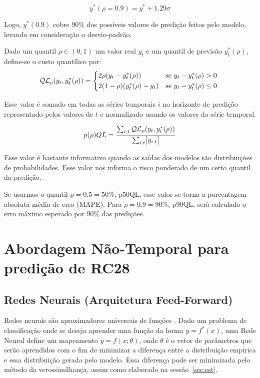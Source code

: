 \[
  y^*(\rho = 0.9) = y^* + 1.29\sigma
\]

Logo, $y^*(0.9)$ cobre $90\%$ dos possíveis valores de predição feitos pelo
modelo, levando em consideração o desvio-padrão.

Dado um quantil $\rho \in (0,1)$ um valor real $y_{t}$ e um quantil de previsão 
$y^{*}_{t}(\rho)$, define-se o custo quantílico por: \\

\begin{equation}
  \mathcal{QL}_{\rho}(y_{t},y^{*}_{t}(\rho)) =
\begin{cases*}
  2 \rho(y_{t} - y^{*}_{t}(\rho)) & se $ y_{t} - y^{*}_{t}(\rho) > 0$ \\
  2 (1 - \rho)(y^{*}_{t}(\rho) - y_{t}) & se $y_{t} - y^{*}_{t}(\rho) \leq 0$
\end{cases*}
\end{equation}


Esse valor é somado em todas as séries temporais $i$ no horizonte de predição
representado pelos valores de $t$ e normalizado usando os valores da série temporal.


\[
   p(\rho)QL = \frac{\sum_{i,t}\mathcal{QL}_{\rho}(y_{t},y^{*}_{t}(\rho))}{\sum_{i,t}\abs{y_{i,t}}}
\]


Esse valor é bastante informativo quando as saídas dos modelos são distribuições
de probabilidades. Esse valor nos informa o risco ponderado de um certo quantil
da predição.

Se usarmos o quantil $\rho=0.5=50\%$, p50QL,
esse valor se torna a porcentagem absoluta média de erro (MAPE). Para
$\rho=0.9=90\%$, p90QL, será
calculado o erro máximo esperado por $90\%$ das predições.





\section{Abordagem Não-Temporal para predição de RC28} 


\subsection{Redes Neurais (Arquitetura Feed-Forward)}

\label{sec:nn}
Redes neurais são aproximadores universais de funções \citep{nnuni}. Dado um problema
de classificação onde se deseja aprender uma função da forma $y = f^*(x)$, uma
Rede Neural define um mapeamento $y = f(x ; \theta)$, onde $\theta$ é o vetor de
parâmetros que serão aprendidos com o fim de minimizar a diferença entre a
distribuição empírica e essa distribuição gerada pelo modelo. Essa diferença pode
ser minimizada pelo método da verossimilhança, assim como elaborado na sessão~\ref{sec:est}.\\

